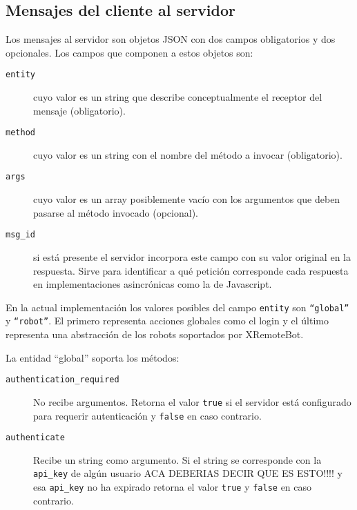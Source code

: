 \subsection{Mensajes del cliente al servidor}

Los mensajes al servidor son objetos JSON con dos campos obligatorios y dos
opcionales. Los campos que componen a estos objetos  son:

\begin{description}
    \item[\texttt{entity}] cuyo valor es un string que describe conceptualmente
        el receptor del mensaje (obligatorio).
    \item[\texttt{method}] cuyo valor es un string con el nombre del método a
        invocar (obligatorio).
    \item[\texttt{args}] cuyo valor es un array posiblemente vacío con los
        argumentos que deben pasarse al método invocado (opcional).
    \item[\texttt{msg\_id}] si está presente el servidor incorpora este
        campo con su valor original en la respuesta. Sirve para identificar a
        qué petición
        corresponde cada respuesta en implementaciones asincrónicas
        como la de Javascript.
\end{description}

En la actual implementación los valores posibles del campo \texttt{entity} son
\texttt{``global''} y \texttt{``robot''}. El primero
representa acciones globales como el login y el último representa una
abstracción de los robots soportados por XRemoteBot.

La entidad ``global'' soporta los métodos:
\begin{description}
    \item[\texttt{authentication\_required}] No recibe argumentos. Retorna el valor 
        \texttt{true} si el servidor está configurado para requerir
        autenticación y \texttt{false} en caso contrario.
    \item[\texttt{authenticate}] Recibe un string como argumento. Si el string se corresponde
        con la \texttt{api\_key} de algún usuario  ACA DEBERIAS DECIR QUE ES ESTO!!!! y esa \texttt{api\_key}  no
        ha expirado retorna el valor \texttt{true} y \texttt{false} en caso contrario.
\end{description}

